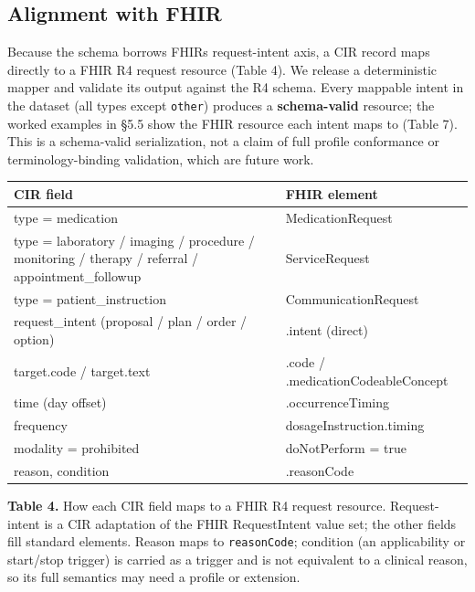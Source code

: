 \subsection{Alignment with FHIR}\label{alignment-with-fhir}

Because the schema borrows FHIR\textquotesingle s request-intent axis, a CIR record maps directly to a FHIR R4 request resource (Table 4). We release a deterministic mapper and validate its output against the R4 schema. Every mappable intent in the dataset (all types except \texttt{other}) produces a \textbf{schema-valid} resource; the worked examples in §5.5 show the FHIR resource each intent maps to (Table 7). This is a schema-valid serialization, not a claim of full profile conformance or terminology-binding validation, which are future work.

\begin{table}[ht]
\centering
\small\setlength{\tabcolsep}{4pt}%
\setlength{\tabcolsep}{4pt}
\begin{tabularx}{\linewidth}{>{\hsize=1.311\hsize\raggedright\arraybackslash}X >{\hsize=0.689\hsize\raggedright\arraybackslash}X}
\toprule
CIR field & FHIR element \\
\midrule
type = medication & MedicationRequest \\
type = laboratory / imaging / procedure / monitoring / therapy / referral / appointment\_\allowbreak{}followup & ServiceRequest \\
type = patient\_\allowbreak{}instruction & CommunicationRequest \\
request\_\allowbreak{}intent (proposal / plan / order / option) & .intent (direct) \\
target.code / target.text & .code / .medicationCodeableConcept \\
time (day offset) & .occurrenceTiming \\
frequency & dosageInstruction.timing \\
modality = prohibited & doNotPerform = true \\
reason, condition & .reasonCode \\
\bottomrule
\end{tabularx}
\end{table}

\textbf{Table 4.} How each CIR field maps to a FHIR R4 request resource. Request-intent is a CIR adaptation of the FHIR RequestIntent value set; the other fields fill standard elements. Reason maps to \texttt{reasonCode}; condition (an applicability or start/stop trigger) is carried as a trigger and is not equivalent to a clinical reason, so its full semantics may need a profile or extension.

